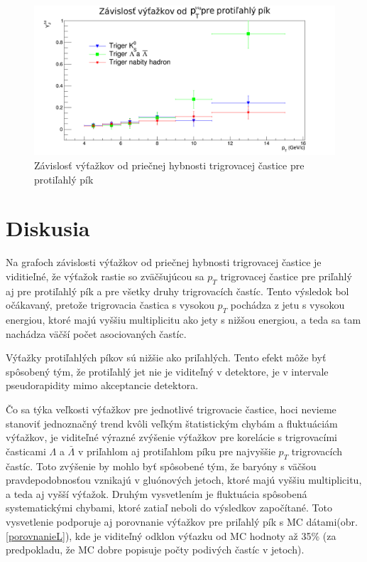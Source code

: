 \documentclass[thesismargins, thesislinespacing]{rnthesis}
\begin{document}
\begin{figure}[hbtp!]
	\centering
	\includegraphics[width=\textwidth]{./Obrazky_praca/vytazok_away.png}
	\caption{Závislosť výťažkov od priečnej hybnosti trigrovacej častice pre protiľahlý pík}
	\label{away}
\end{figure}

\chapter{Diskusia}
 
Na grafoch závislosti výťažkov od priečnej hybnosti trigrovacej častice je viditieľné, že výťažok rastie so zväčšujúcou sa $p_T$ trigrovacej častice pre priľahlý aj pre protiľahlý pík a pre všetky druhy trigrovacích častíc. Tento výsledok bol očákavaný, pretože trigrovacia častica s vysokou $p_T$ pochádza z jetu s vysokou energiou, ktoré majú vyššiu multiplicitu ako jety s nižšou energiou, a teda sa tam nachádza väčší počet asociovaných častíc. 

Výťažky protiľahlých píkov sú nižšie ako priľahlých. Tento efekt môže byť spôsobený tým, že protiľahlý jet nie je viditeľný v detektore, je v intervale pseudorapidity mimo akceptancie detektora. 

Čo sa týka veľkosti výťažkov pre jednotlivé trigrovacie častice, hoci nevieme stanoviť jednoznačný trend kvôli veľkým štatistickým chybám a fluktuáciám výťažkov, je viditeľné výrazné zvýšenie výťažkov pre korelácie s trigrovacími časticami $\Lambda$ a $\bar{\Lambda}$ v priľahlom aj protiľahlom píku pre najvyššie $p_T$ trigrovacích častíc. Toto zvýšenie by mohlo byť spôsobené tým, že baryóny s väčšou pravdepodobnosťou vznikajú v gluónových jetoch, ktoré majú vyššiu multiplicitu, a teda aj vyšší výťažok. Druhým vysvetlením je fluktuácia spôsobená systematickými chybami, ktoré zatiaľ neboli do výsledkov započítané. Toto vysvetlenie podporuje aj porovnanie výťažkov pre priľahlý pík s MC dátami(obr. \ref{porovnanieL}), kde je viditeľný odklon výťazku od MC hodnoty až 35\% (za predpokladu, že MC dobre popisuje počty podivých častíc v jetoch).    
\end{document}
